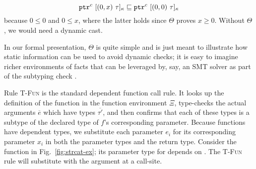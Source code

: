 {\small
$$
\tallarrayptr{0}{x}{\tau}{c} \sqsubseteq \tallarrayptr{0}{0}{\tau}{c}
$$
}
because $0 \leq 0$ and $0 \leq x$, where the latter holds since
$\Theta$ proves $x \ge 0$.  Without $\Theta$, we would need a
dynamic cast.

In our formal presentation, $\Theta$ is quite simple and is just meant
to illustrate how static information can be used to avoid dynamic
checks; it is easy to imagine richer environments of facts that can be
leveraged by, say, an SMT solver as part of the subtyping
check \cite{LiquidHaskell,Refinementlh}.



%
Rule \textsc{T-Fun} is the standard dependent function call rule. It
looks up the definition of the function in the function environment
$\Xi$, type-checks the actual arguments $\overline{e}$ which have
types $\overline{\tau'}$, and then confirms that each of these types
is a subtype of the declared type of $f$'s corresponding parameter. Because
functions have dependent types, we substitute each parameter $e_i$ for
its corresponding parameter $x_i$ in both the parameter types and the
return type. Consider the  function in
Fig.~\ref{fig:strcat-ex}; its parameter type for  
depends on . The \textsc{T-Fun} rule will substitute 
 with the argument at a call-site.

